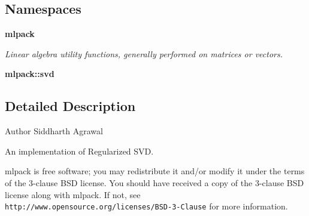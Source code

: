\subsection*{Namespaces}
\begin{DoxyCompactItemize}
\item 
 \textbf{ mlpack}
\begin{DoxyCompactList}\small\item\em Linear algebra utility functions, generally performed on matrices or vectors. \end{DoxyCompactList}\item 
 \textbf{ mlpack\+::svd}
\end{DoxyCompactItemize}


\subsection{Detailed Description}
\begin{DoxyAuthor}{Author}
Siddharth Agrawal
\end{DoxyAuthor}
An implementation of Regularized S\+VD.

mlpack is free software; you may redistribute it and/or modify it under the terms of the 3-\/clause B\+SD license. You should have received a copy of the 3-\/clause B\+SD license along with mlpack. If not, see {\tt http\+://www.\+opensource.\+org/licenses/\+B\+S\+D-\/3-\/\+Clause} for more information. 